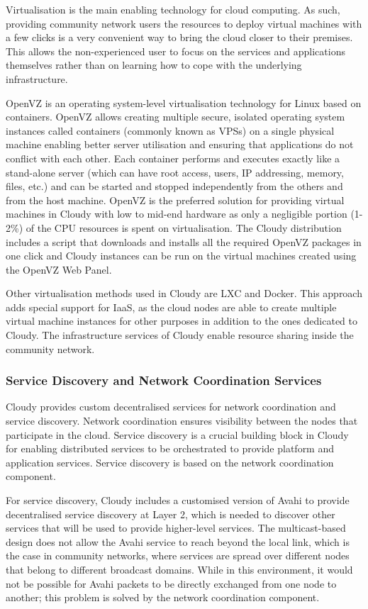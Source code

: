 Virtualisation is the main enabling technology for cloud computing. As such, providing community network users the resources to deploy virtual machines with a few clicks is a very convenient way to bring the cloud closer to their premises. This allows the non-experienced user to focus on the services and applications themselves rather than on learning how to cope with the underlying infrastructure.

OpenVZ \cite{OpenVZ} is an operating system-level virtualisation technology for Linux based on containers. OpenVZ allows creating multiple secure, isolated  operating system instances called containers (commonly known as VPSs) on a single physical machine enabling better server utilisation and ensuring that applications do not conflict with each other. Each container performs and executes exactly like a stand-alone server (which can have root access, users, IP addressing, memory, files, etc.) and can be started and stopped independently from the others and from the host machine. 
OpenVZ is the preferred solution for providing virtual machines in Cloudy with low to mid-end hardware as only a negligible portion (1-2\%) of the CPU resources is spent on virtualisation. 
The Cloudy distribution includes a script that downloads and installs all the required OpenVZ packages in one click and Cloudy instances can be run on the virtual machines created using the OpenVZ Web Panel.

Other virtualisation methods used in Cloudy are LXC and Docker. 
This approach adds special support for IaaS, as the cloud nodes are able to create multiple virtual machine instances for other purposes in addition to the ones dedicated to Cloudy. The infrastructure services of Cloudy enable resource sharing inside the community network.

\subsubsection{Service Discovery and Network Coordination Services}

Cloudy provides custom decentralised services for network coordination and service discovery. Network coordination ensures visibility between the nodes that participate in the cloud.  Service discovery is a crucial building block in Cloudy for enabling distributed services to be orchestrated to provide platform and application services. Service discovery is based on the network coordination component.

For service discovery, Cloudy includes a customised version of Avahi \cite{Avahi} to provide decentralised service discovery at Layer 2, which is needed to discover other services that will be used to provide higher-level services. The multicast-based design does not allow the Avahi service to reach beyond the local link, which is the case in community networks, where services are spread over different nodes that belong to different broadcast domains. While in this environment, it would not be possible for Avahi packets to be directly exchanged from one node to another; this problem is solved by the network coordination component. 

